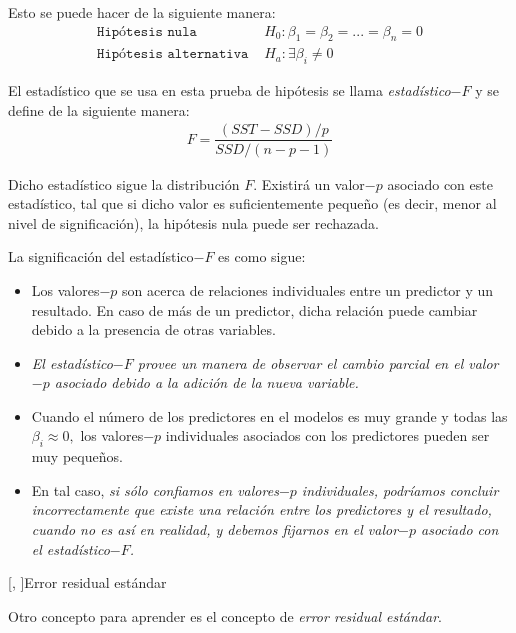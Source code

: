Esto se puede hacer de la siguiente manera:
\begin{align}
	\texttt{Hipótesis nula }& H_{0}:\beta_{1}=\beta_{2}=...=\beta_{n}=0 \\
	\texttt{Hipótesis alternativa }& H_{a}: \exists \beta_{i}\neq 0
\end{align}



El estadístico que se usa en esta prueba de hipótesis se llama \emph{estadístico$-F$} y se define de la siguiente manera:
\begin{align}
	F = \dfrac{\left( SST -SSD \right)/p}{SSD/\left( n-p-1 \right)}
\end{align}



Dicho estadístico sigue la distribución $F$.
Existirá un valor$-p$ asociado con este estadístico, tal que si dicho valor es suficientemente pequeño (es decir, menor al nivel de significación), la hipótesis nula puede ser rechazada.


La significación del estadístico$-F$ es como sigue:
\begin{itemize}
	\item Los valores$-p$ son acerca de relaciones individuales entre un predictor y un resultado. En caso de más de un predictor, dicha relación puede cambiar debido a la presencia de otras variables.
	
	
	\item
	\emph{El estadístico$-F$ provee un manera de observar el cambio parcial en el valor$-p$ asociado debido a la adición de la nueva variable.}
	
	
	\item Cuando el número de los predictores en el modelos es muy grande y todas las $\beta_{i}\approx 0,$ los valores$-p$ individuales asociados con los predictores pueden ser muy pequeños.
	
	
	\item
	En tal caso, \emph{si sólo confiamos en valores$-p$ individuales, podríamos concluir incorrectamente que existe una relación entre los predictores y el resultado, cuando no es así en realidad, y debemos fijarnos en el valor$-p$ asociado con el estadístico$-F$.}
\end{itemize}



[, ]{Error residual estándar}

Otro concepto para aprender es el concepto de \emph{error residual estándar}.



